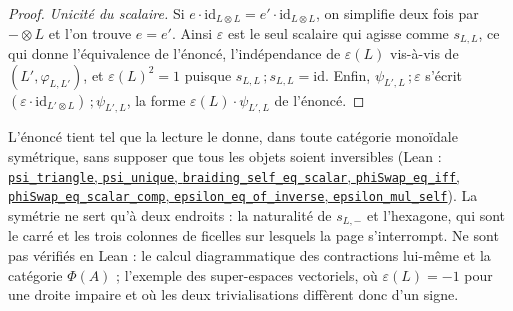 \begin{proof}
\emph{Unicité du scalaire.} Si $e \cdot \mathrm{id}_{L \otimes L} = e' \cdot \mathrm{id}_{L \otimes L}$, on simplifie deux fois par $- \otimes L$ et l'on trouve $e = e'$. Ainsi $\varepsilon$ est le seul scalaire qui agisse comme $s_{L,L}$, ce qui donne l'équivalence de l'énoncé, l'indépendance de $\varepsilon(L)$ vis-à-vis de $(L', \varphi_{L,L'})$, et $\varepsilon(L)^2 = 1$ puisque $s_{L,L}\,;s_{L,L} = \mathrm{id}$. Enfin, $\psi_{L',L}\,;\varepsilon$ s'écrit $(\varepsilon \cdot \mathrm{id}_{L' \otimes L})\,;\psi_{L',L}$, la forme $\varepsilon(L) \cdot \psi_{L',L}$ de l'énoncé.
\end{proof}

\begingroup\raggedright
L'énoncé tient tel que la lecture le donne, dans toute catégorie monoïdale symétrique, sans supposer que tous les objets soient inversibles (Lean : \href{\leanblobmain/CategoryTheory/Folder161_1.lean}{\texttt{psi\_triangle}, \texttt{psi\_unique}, \texttt{braiding\_self\_eq\_scalar}, \texttt{phiSwap\_eq\_iff}, \texttt{phiSwap\_eq\_scalar\_comp}, \texttt{epsilon\_eq\_of\_inverse}, \texttt{epsilon\_mul\_self}}). La symétrie ne sert qu'à deux endroits : la naturalité de $s_{L,-}$ et l'hexagone, qui sont le carré et les trois colonnes de ficelles sur lesquels la page s'interrompt. Ne sont pas vérifiés en Lean : le calcul diagrammatique des contractions lui-même et la catégorie $\Phi(A)$ ; l'exemple des super-espaces vectoriels, où $\varepsilon(L) = -1$ pour une droite impaire et où les deux trivialisations diffèrent donc d'un signe.\par\endgroup
